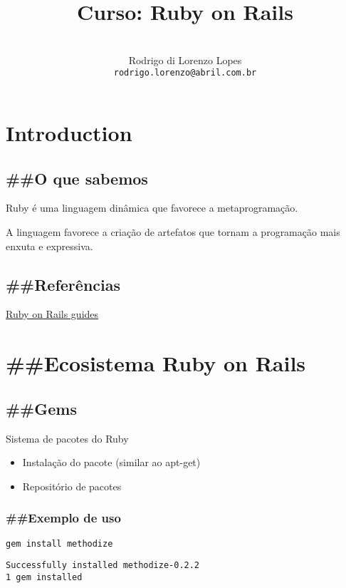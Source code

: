 \documentclass[serif,mathserif]{article}
\author{ 
    \\ Rodrigo di Lorenzo Lopes \\  \texttt{rodrigo.lorenzo@abril.com.br}
}
\title{Curso: Ruby on Rails}
\begin{document}
\maketitle
 
\tableofcontents

\section{Introduction}

\subsection{\#\#O que sabemos}

Ruby é uma linguagem dinâmica que favorece a metaprogramação.

A linguagem favorece a criação de artefatos que tornam a programação mais enxuta e expressiva.

\subsection{\#\#Referências}

\href{http://guias.rubyonrails.com.br/}{Ruby on Rails guides}

\section{\#\#Ecosistema Ruby on Rails}

\subsection{\#\#Gems}

Sistema de pacotes do Ruby

\begin{itemize}
  \item Instalação do pacote (similar ao apt-get)
  \item Repositório de pacotes 
\end{itemize}

\subsubsection{\#\#Exemplo de uso}
\begin{lstlisting}
gem install methodize
\end{lstlisting}

\begin{verbatim}
Successfully installed methodize-0.2.2
1 gem installed
\end{verbatim}
\end{document}
